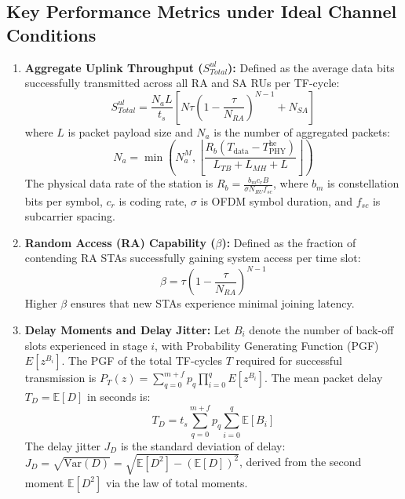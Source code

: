\subsection{Key Performance Metrics under Ideal Channel Conditions}
\begin{enumerate}
    \item \textbf{Aggregate Uplink Throughput ($S_{Total}^{ul}$):} Defined as the average data bits successfully transmitted across all RA and SA RUs per TF-cycle:
    \begin{equation}
        S_{Total}^{ul} = \frac{N_a L}{t_s} \left[ N \tau \left(1 - \frac{\tau}{N_{RA}}\right)^{N-1} + N_{SA} \right]
        \label{eq:ax_throughput_ideal}
    \end{equation}
    where $L$ is packet payload size and $N_a$ is the number of aggregated packets:
    \begin{equation}
        N_a = \min\left( N_a^M, \left\lfloor \frac{R_b (T_{\text{data}} - T_{\text{PHY}}^{\text{he}})}{L_{TB} + L_{MH} + L} \right\rfloor \right)
    \end{equation}
    The physical data rate of the station is $R_b = \frac{b_m c_r B}{\sigma N_{RU} f_{sc}}$, where $b_m$ is constellation bits per symbol, $c_r$ is coding rate, $\sigma$ is OFDM symbol duration, and $f_{sc}$ is subcarrier spacing.
    
    \item \textbf{Random Access (RA) Capability ($\beta$):} Defined as the fraction of contending RA STAs successfully gaining system access per time slot:
    \begin{equation}
        \beta = \tau \left(1 - \frac{\tau}{N_{RA}}\right)^{N-1}
        \label{eq:ax_ra_capability}
    \end{equation}
    Higher $\beta$ ensures that new STAs experience minimal joining latency.
    
    \item \textbf{Delay Moments and Delay Jitter:} Let $B_i$ denote the number of back-off slots experienced in stage $i$, with Probability Generating Function (PGF) $E[z^{B_i}]$. The PGF of the total TF-cycles $T$ required for successful transmission is $P_T(z) = \sum_{q=0}^{m+f} p_q \prod_{i=0}^q E[z^{B_i}]$. The mean packet delay $T_D = \mathbb{E}[D]$ in seconds is:
    \begin{equation}
        T_D = t_s \sum_{q=0}^{m+f} p_q \sum_{i=0}^q \mathbb{E}[B_i]
    \end{equation}
    The delay jitter $J_D$ is the standard deviation of delay: $J_D = \sqrt{\text{Var}(D)} = \sqrt{\mathbb{E}[D^2] - (\mathbb{E}[D])^2}$, derived from the second moment $\mathbb{E}[D^2]$ via the law of total moments.
    

\end{enumerate}
